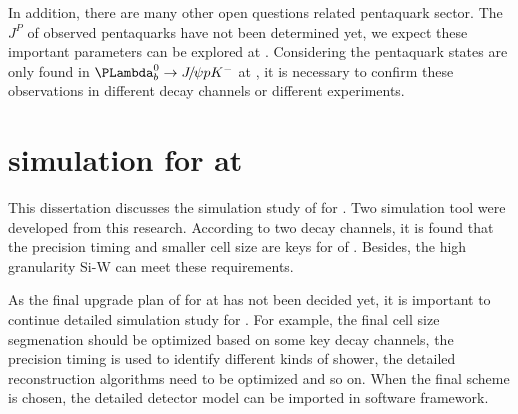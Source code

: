 In addition,
there are many other open questions related pentaquark sector.
The $J^{P}$ of observed pentaquarks have not been determined yet,
we expect these important parameters can be explored at \lhcb. 
Considering the pentaquark states are only found in $\Lb\to\jpsi\proton\Km$ at \lhcb,
it is necessary to confirm these observations in different decay channels or different experiments.


\section{\ecal simulation for \upgradetwo at \lhcb}

This dissertation discusses the simulation study of \ecal for \lhcb \upgradetwo.
Two simulation tool were developed from this research.
According to two decay channels,
it is found that the precision timing and smaller cell size are keys for \upgradetwo of \ecal.
Besides,
the high granularity Si-W \ecal can meet these requirements.

As the final upgrade plan of \ecal for \upgradetwo at \lhcb has not been decided yet,
it is important to continue detailed simulation study for \ecal \upgradetwo.
For example,
the final cell size segmenation should be optimized based on some key decay channels,
the precision timing is used to identify different kinds of shower,
the detailed reconstruction algorithms need to be optimized and so on.
When the final scheme is chosen,
the detailed detector model can be imported in \lhcb software framework. 




